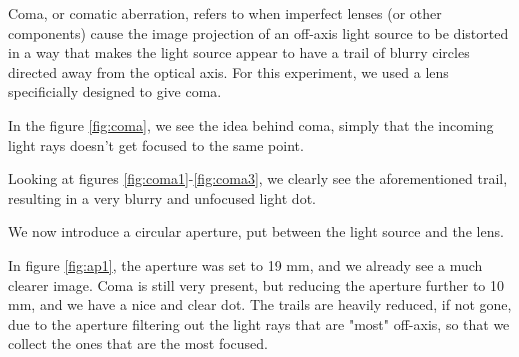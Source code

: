 
Coma, or comatic aberration, refers to when imperfect lenses 
(or other components) cause the image projection of an off-axis 
light source to be distorted in a way that makes the light source
appear to have a trail of blurry circles directed away from the 
optical axis. For this experiment, we used a lens specificially 
designed to give coma. 

In the figure \vref{fig:coma}, we see the idea behind coma, 
simply that the incoming light rays doesn't get focused to the same point.



Looking at figures \vref{fig:coma1}-\vref{fig:coma3}, we clearly see the aforementioned
trail, resulting in a very blurry and unfocused light dot.

We now introduce a circular aperture, put between the light source and the lens.

In figure \vref{fig:ap1}, the aperture was set to 19 mm, and we already see
a much clearer image. Coma is still very present, but reducing the aperture
further to 10 mm, and we have a nice and clear dot. The trails are heavily 
reduced, if not gone, due to the aperture filtering out the light rays that 
are "most" off-axis, so that we collect the ones that are the most focused.

